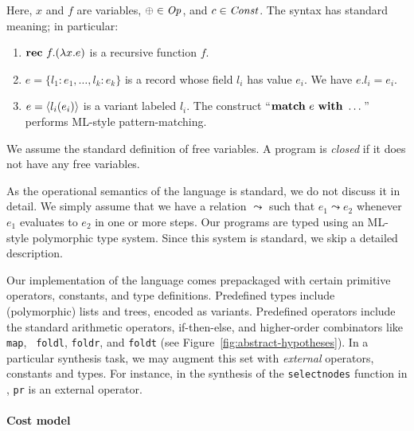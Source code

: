 Here, $x$ and $f$ are variables, $\oplus \in \mathit{Op}$, and $c \in \mathit{Const}$.
The syntax has standard meaning; in particular:
\begin{enumerate}
\item $\mathbf{rec}~f.(\lambda x. e)$ is a recursive function $f$.

\item $e = \{ l_1: e_1,\dots, l_k: e_k \}$ is a record whose
field $l_i$ has value $e_i$. We have $e.l_i = e_i$.

\item $e = \langle l_i(e_i) \rangle$ is a variant labeled $l_i$. The construct
  ``$\mathbf{match}~e~\mathbf{with}~\dots$'' performs ML-style pattern-matching. 
\end{enumerate}
We assume the standard definition of free variables. A
program is {\em closed} if it does not have any free variables.

As the operational semantics of the language is standard, we do not
discuss it in detail. We simply assume that we have a relation $\leadsto$
such that $e_1 \leadsto e_2$ whenever $e_1$ evaluates to $e_2$ in one
or more steps. 
Our programs are typed using an ML-style polymorphic type system. Since this
system is standard,  we skip a detailed description.

Our implementation of the language comes prepackaged with certain
primitive operators, constants, and type definitions. Predefined types
include (polymorphic) lists and trees, encoded as variants.
Predefined operators include the standard arithmetic operators,
if-then-else, and higher-order combinators like {\tt map}, {\tt
  foldl}, {\tt foldr}, and {\tt foldt} (see Figure~\ref{fig:abstract-hypotheses}). In a particular synthesis
task, we may augment this set with {\em external} operators, constants
and types. For instance, in the synthesis of the \verb+selectnodes+
function in , {\tt pr} is an external operator.


\newcommand{\C}{\mathcal{C}}
\paragraph{Cost model}

